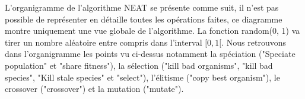 \documentclass{article}
\begin{document}
L'organigramme de l'algorithme NEAT se présente comme suit, il n'est pas possible de représenter en détaille toutes les opérations faites, ce diagramme montre uniquement une vue globale de l'algorithme. La fonction random(0, 1) va tirer un nombre aléatoire entre compris dans l'interval $[0, 1[$. Nous retrouvons dans l'organigramme les points vu ci-dessus notamment la spéciation ("Speciate population" et "share fitness"), la sélection ("kill bad organisms", "kill bad species", "Kill stale species" et "select"),  l'élitisme ("copy best organism"), le crossover ("crossover") et la mutation ("mutate").
\newpage
\end{document}
